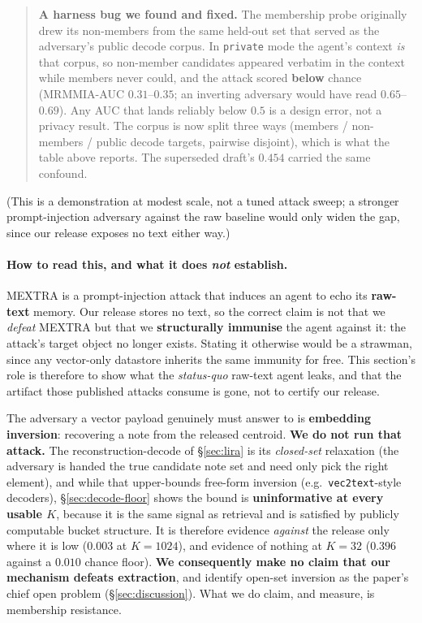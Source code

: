 \documentclass[pdflatex,sn-mathphys-num,iicol]{sn-jnl}
\theoremstyle{thmstyleone}%
\theoremstyle{thmstyletwo}%
\theoremstyle{thmstylethree}%
\newcommand{\secref}[1]{\S\ref{#1}}
\begin{document}
\begin{quote}
\textbf{A harness bug we found and fixed.} The membership probe originally drew its non-members
from the same held-out set that served as the adversary's public decode corpus. In
\texttt{private} mode the agent's context \emph{is} that corpus, so non-member candidates appeared
verbatim in the context while members never could, and the attack scored \textbf{below} chance
(MRMMIA-AUC $0.31$--$0.35$; an inverting adversary would have read $0.65$--$0.69$). Any AUC that
lands reliably below $0.5$ is a design error, not a privacy result. The corpus is now split three
ways (members / non-members / public decode targets, pairwise disjoint), which is what the
table above reports. The superseded draft's $0.454$ carried the same confound.
\end{quote}

(This is a demonstration at modest scale, not a tuned attack sweep; a stronger prompt-injection
adversary against the raw baseline would only widen the gap, since our release exposes no text
either way.)

\paragraph{How to read this, and what it does \emph{not} establish.} MEXTRA is a
prompt-injection attack that induces an agent to echo its \textbf{raw-text} memory. Our release
stores no text, so the correct claim is not that we \emph{defeat} MEXTRA but that we
\textbf{structurally immunise} the agent against it: the attack's target object no longer exists.
Stating it otherwise would be a strawman, since any vector-only datastore inherits the same
immunity for free. This section's role is therefore to show what the \emph{status-quo} raw-text
agent leaks, and that the artifact those published attacks consume is gone, not to certify our
release.

The adversary a vector payload genuinely must answer to is \textbf{embedding inversion}:
recovering a note from the released centroid. \textbf{We do not run that attack.} The
reconstruction-decode of \secref{sec:lira} is its \emph{closed-set} relaxation (the adversary
is handed the true candidate note set and need only pick the right element), and while that
upper-bounds free-form inversion (e.g.\ \texttt{vec2text}-style decoders), \secref{sec:decode-floor}
shows the bound is \textbf{uninformative at every usable $K$}, because it is the same signal as
retrieval and is satisfied by publicly computable bucket structure. It is therefore evidence
\emph{against} the release only where it is low ($0.003$ at $K = 1024$), and evidence of nothing
at $K = 32$ ($0.396$ against a $0.010$ chance floor). \textbf{We consequently make no claim that
our mechanism defeats extraction}, and identify open-set inversion as the paper's chief open
problem (\secref{sec:discussion}). What we do claim, and measure, is membership resistance.
\end{document}
